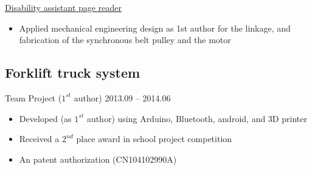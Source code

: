 \documentclass[11pt,a4paper,sans]{moderncv}
\begin{document}
\vspace{6pt}

\underline{Disability assistant page reader}
\vspace{4pt}
\begin{itemize}
\item Applied mechanical engineering design as 1st author for the linkage, and fabrication of the synchronous belt pulley and the motor
\end{itemize} 

\subsection{Forklift truck system}
Team Project ($1^{st}$ author) \hfill 2013.09 -- 2014.06
\begin{itemize}
\item Developed (as $1^{st}$ author) using Arduino, Bluetooth, android, and 3D printer
\item Received a $2^{nd}$ place award in school project competition
\item An patent authorization (CN104102990A)
\end{itemize}
\end{document}
